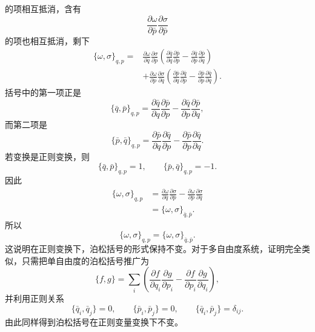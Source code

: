 \begin{solution}[泊松括号不变性]
\[\]
的项相互抵消，含有
\[
\frac{\partial \omega}{\partial \bar p}
\frac{\partial \sigma}{\partial \bar p}
\]
的项也相互抵消，剩下
\[
\begin{aligned}
\{\omega,\sigma\}_{q,p}
={}&
\frac{\partial \omega}{\partial \bar q}
\frac{\partial \sigma}{\partial \bar p}
\left(
\frac{\partial \bar q}{\partial q}\frac{\partial \bar p}{\partial p}
-
\frac{\partial \bar q}{\partial p}\frac{\partial \bar p}{\partial q}
\right)\\
&+
\frac{\partial \omega}{\partial \bar p}
\frac{\partial \sigma}{\partial \bar q}
\left(
\frac{\partial \bar p}{\partial q}\frac{\partial \bar q}{\partial p}
-
\frac{\partial \bar p}{\partial p}\frac{\partial \bar q}{\partial q}
\right).
\end{aligned}
\]
括号中的第一项正是
\[
\{\bar q,\bar p\}_{q,p}
=
\frac{\partial \bar q}{\partial q}\frac{\partial \bar p}{\partial p}
-
\frac{\partial \bar q}{\partial p}\frac{\partial \bar p}{\partial q},
\]
而第二项是
\[
\{\bar p,\bar q\}_{q,p}
=
\frac{\partial \bar p}{\partial q}\frac{\partial \bar q}{\partial p}
-
\frac{\partial \bar p}{\partial p}\frac{\partial \bar q}{\partial q}.
\]
若变换是正则变换，则
\[
\{\bar q,\bar p\}_{q,p}=1,\qquad
\{\bar p,\bar q\}_{q,p}=-1.
\]
因此
\[
\begin{aligned}
\{\omega,\sigma\}_{q,p}
&=
\frac{\partial \omega}{\partial \bar q}
\frac{\partial \sigma}{\partial \bar p}
-
\frac{\partial \omega}{\partial \bar p}
\frac{\partial \sigma}{\partial \bar q}\\
&=
\{\omega,\sigma\}_{\bar q,\bar p}.
\end{aligned}
\]
所以
\[
\boxed{\{\omega,\sigma\}_{q,p}=\{\omega,\sigma\}_{\bar q,\bar p}.}
\]
这说明在正则变换下，泊松括号的形式保持不变。对于多自由度系统，证明完全类似，只需把单自由度的泊松括号推广为
\[
\{f,g\}
=
\sum_i
\left(
\frac{\partial f}{\partial q_i}\frac{\partial g}{\partial p_i}
-
\frac{\partial f}{\partial p_i}\frac{\partial g}{\partial q_i}
\right),
\]
并利用正则关系
\[
\{\bar q_i,\bar q_j\}=0,\qquad
\{\bar p_i,\bar p_j\}=0,\qquad
\{\bar q_i,\bar p_j\}=\delta_{ij}.
\]
由此同样得到泊松括号在正则变量变换下不变。
\end{solution}